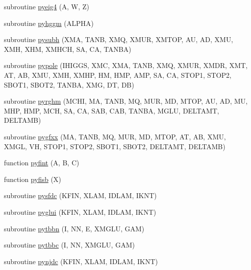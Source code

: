 \begin{DoxyCompactItemize}
\item 
subroutine \hyperlink{pythia-6_84_824_8f_afebb24c57866a2c33d3fcd7dde0a92a9}{pyeig4} (A, W, Z)
\item 
subroutine \hyperlink{pythia-6_84_824_8f_a2f18cde517352a5c3f7bc2ee36b024f6}{pyhggm} (A\+L\+P\+HA)
\item 
subroutine \hyperlink{pythia-6_84_824_8f_a7e535453f3a2ab99f6de4132a7832ca7}{pysubh} (X\+MA, T\+A\+NB, X\+MQ, X\+M\+UR, X\+M\+T\+OP, AU, AD, X\+MU, X\+MH, X\+HM, X\+M\+H\+CH, SA, CA, T\+A\+N\+BA)
\item 
subroutine \hyperlink{pythia-6_84_824_8f_a6b22add9875061c72765412e8677c643}{pypole} (I\+H\+I\+G\+GS, X\+MC, X\+MA, T\+A\+NB, X\+MQ, X\+M\+UR, X\+M\+DR, X\+MT, AT, AB, X\+MU, X\+MH, X\+M\+HP, HM, H\+MP, A\+MP, SA, CA, S\+T\+O\+P1, S\+T\+O\+P2, S\+B\+O\+T1, S\+B\+O\+T2, T\+A\+N\+BA, X\+MG, DT, DB)
\item 
subroutine \hyperlink{pythia-6_84_824_8f_a623bc0a2928b826db2adab2e3c046236}{pyrghm} (M\+C\+HI, MA, T\+A\+NB, MQ, M\+UR, MD, M\+T\+OP, AU, AD, MU, M\+HP, H\+MP, M\+CH, SA, CA, S\+AB, C\+AB, T\+A\+N\+BA, M\+G\+LU, D\+E\+L\+T\+A\+MT, D\+E\+L\+T\+A\+MB)
\item 
subroutine \hyperlink{pythia-6_84_824_8f_a2b64fdfa9f23edaf0725fc21687a97f1}{pygfxx} (MA, T\+A\+NB, MQ, M\+UR, MD, M\+T\+OP, AT, AB, X\+MU, X\+M\+GL, VH, S\+T\+O\+P1, S\+T\+O\+P2, S\+B\+O\+T1, S\+B\+O\+T2, D\+E\+L\+T\+A\+MT, D\+E\+L\+T\+A\+MB)
\item 
function \hyperlink{pythia-6_84_824_8f_a369d7e63cec7143fa767be7fa08b89a9}{pyfint} (A, B, C)
\item 
function \hyperlink{pythia-6_84_824_8f_a32f0801512389f79c516bff896178a3e}{pyfisb} (X)
\item 
subroutine \hyperlink{pythia-6_84_824_8f_a900077d4b755202f49fd8971336b5721}{pysfdc} (K\+F\+IN, X\+L\+AM, I\+D\+L\+AM, I\+K\+NT)
\item 
subroutine \hyperlink{pythia-6_84_824_8f_a0e8de9275c7066b56e9cc2704eda4d9b}{pyglui} (K\+F\+IN, X\+L\+AM, I\+D\+L\+AM, I\+K\+NT)
\item 
subroutine \hyperlink{pythia-6_84_824_8f_a590e74787b29c2abd5a46aa6489d5219}{pytbbn} (I, NN, E, X\+M\+G\+LU, G\+AM)
\item 
subroutine \hyperlink{pythia-6_84_824_8f_afc82dd2989aea861fb20cd99499075ed}{pytbbc} (I, NN, X\+M\+G\+LU, G\+AM)
\item 
subroutine \hyperlink{pythia-6_84_824_8f_a4eb734124cd851ea27210387798a8ad9}{pynjdc} (K\+F\+IN, X\+L\+AM, I\+D\+L\+AM, I\+K\+NT)
\item 

\end{DoxyCompactItemize}
